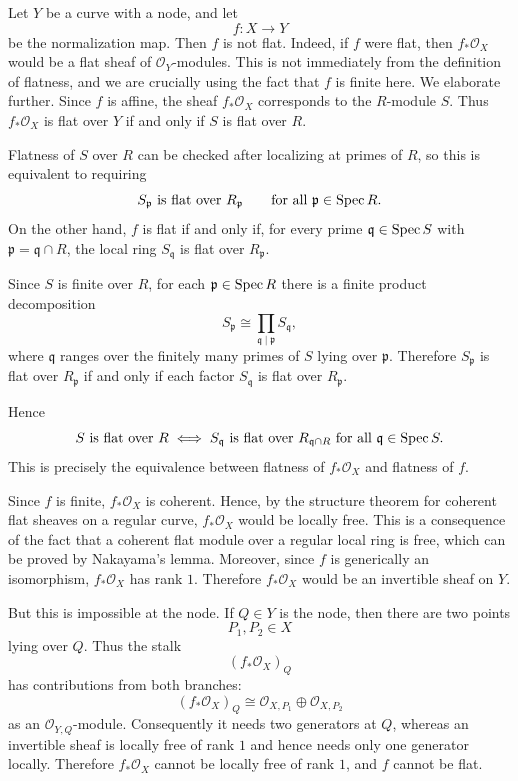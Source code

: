 \documentclass[12pt]{article}
\begin{document}
\begin{example}
    Let $Y$ be a curve with a node, and let
    \[
        f\colon X \to Y
    \]
    be the normalization map. Then $f$ is not flat. Indeed, if $f$ were flat, then $f_*\mathcal O_X$ would be a flat sheaf of $\mathcal O_Y$-modules. This is not immediately from the definition of flatness, and we are crucially using the fact that $f$ is finite here. We elaborate further. Since $f$ is affine, the sheaf $f_*\mathcal O_X$ corresponds to the $R$-module $S$. Thus $f_*\mathcal O_X$ is flat over $Y$ if and only if $S$ is flat over $R$.

    Flatness of $S$ over $R$ can be checked after localizing at primes of $R$, so this is equivalent to requiring
    \[
        S_{\mathfrak p} \text{ is flat over } R_{\mathfrak p}
        \qquad
        \text{for all } \mathfrak p \in \operatorname{Spec} R.
    \]
    On the other hand, $f$ is flat if and only if, for every prime $\mathfrak q \in \operatorname{Spec} S$ with $\mathfrak p=\mathfrak q\cap R$, the local ring $S_{\mathfrak q}$
    is flat over $R_{\mathfrak p}$.

    Since $S$ is finite over $R$, for each $\mathfrak p\in \operatorname{Spec} R$ there is a finite product decomposition
    \[
        S_{\mathfrak p}
        \cong
        \prod_{\mathfrak q\mid \mathfrak p} S_{\mathfrak q},
    \]
    where $\mathfrak q$ ranges over the finitely many primes of $S$ lying over $\mathfrak p$. Therefore $S_{\mathfrak p}$ is flat over $R_{\mathfrak p}$ if and only if each factor $S_{\mathfrak q}$ is flat over $R_{\mathfrak p}$.

    Hence
    \[
        S \text{ is flat over } R
        \iff
        S_{\mathfrak q} \text{ is flat over } R_{\mathfrak q\cap R}
        \text{ for all } \mathfrak q\in \operatorname{Spec} S.
    \]
    This is precisely the equivalence between flatness of $f_*\mathcal O_X$ and flatness of $f$.

    Since $f$ is finite, $f_*\mathcal O_X$ is coherent. Hence, by the structure theorem for coherent flat sheaves on a regular curve, $f_*\mathcal O_X$ would be locally free. This is a consequence of the fact that a coherent flat module over a regular local ring is free, which can be proved by Nakayama's lemma. Moreover, since $f$ is generically an isomorphism, $f_*\mathcal O_X$ has rank $1$. Therefore $f_*\mathcal O_X$ would be an invertible sheaf on $Y$.

    But this is impossible at the node. If $Q\in Y$ is the node, then there are two points
    \[
        P_1,P_2\in X
    \]
    lying over $Q$. Thus the stalk
    \[
        (f_*\mathcal O_X)_Q
    \]
    has contributions from both branches:
    \[
        (f_*\mathcal O_X)_Q
        \cong
        \mathcal O_{X,P_1}\oplus \mathcal O_{X,P_2}
    \]
    as an $\mathcal O_{Y,Q}$-module. Consequently it needs two generators at $Q$, whereas an invertible sheaf is locally free of rank $1$ and hence needs only one generator locally. Therefore $f_*\mathcal O_X$ cannot be locally free of rank $1$, and $f$ cannot be flat.
\end{example}
\end{document}
